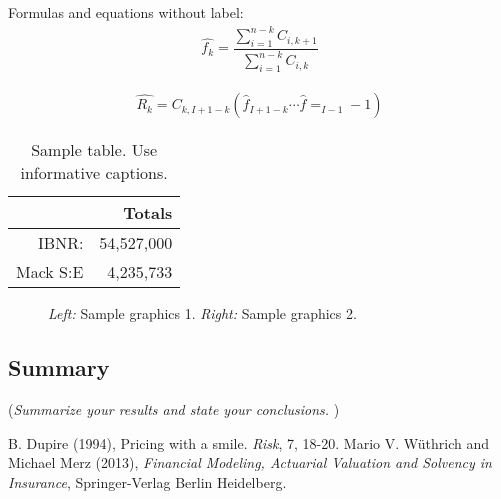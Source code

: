 \documentclass[11pt]{article}
\begin{document}
Formulas and equations without label:
\begin{align*}
	\hat{f_k} = \dfrac{\sum_{i=1}^{n-k} C_{i,k+1}} {\sum_{i=1}^{n-k} C_{i,k}}
\end{align*}

\begin{align*}
	\hat{R_k} = C_{k,I+1-k} \left(  \hat{f}_{I+1-k} \cdots \hat{f}=_{I-1}-1\right)
\end{align*}


\begin{table}[!ht]
\center
\begin{tabular}{rr}
	& Totals \\ 
\hline
IBNR: & 54,527,000 \\
Mack S:E & 4,235,733\\
\hline
\end{tabular}
\caption{Sample table. Use informative captions.} \label{tab:sampletab}
\end{table}




 \begin{figure}[!ht]
 \center
  \caption{\emph{Left:} Sample graphics 1. \emph{Right:} Sample graphics 2.}
  \label{fig:samplefig2}
\end{figure}


\subsection*{Summary}
({\it Summarize your results and state your conclusions. })



\begin{thebibliography}{99}
B. Dupire (1994),
Pricing with a smile.
\emph{Risk}, 7, 18-20.
  Mario V. W\"{u}thrich and Michael Merz (2013),
  \emph{Financial Modeling, Actuarial Valuation and Solvency in Insurance},
  Springer-Verlag Berlin Heidelberg.
\end{thebibliography}
\end{document}
